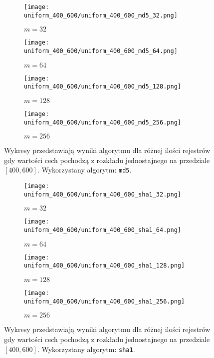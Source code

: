 \begin{figure}[H]
    \begin{subfigure}{0.5\textwidth}
        \texttt{[image: uniform\_400\_600/uniform\_400\_600\_md5\_32.png]}
        \caption{$m = 32$}
        \label{fig:subim1}
    \end{subfigure}
    \begin{subfigure}{0.5\textwidth}
        \texttt{[image: uniform\_400\_600/uniform\_400\_600\_md5\_64.png]}
        \caption{$m = 64$}
        \label{fig:subim1}
    \end{subfigure}
    \begin{subfigure}{0.5\textwidth}
        \texttt{[image: uniform\_400\_600/uniform\_400\_600\_md5\_128.png]}
        \caption{$m = 128$}
        \label{fig:subim2}
    \end{subfigure}
    \begin{subfigure}{0.5\textwidth}
        \texttt{[image: uniform\_400\_600/uniform\_400\_600\_md5\_256.png]}
        \caption{$m = 256$}
        \label{fig:subim2}
    \end{subfigure}

    \caption{Wykresy przedstawiają wyniki algorytmu dla różnej ilości rejestrów gdy wartości cech pochodzą z rozkładu jednostajnego na przedziale $[400, 600]$. Wykorzystany algorytm: \texttt{md5}.}
    \label{fig:uniform_md5}
\end{figure}

\begin{figure}[H]
    \begin{subfigure}{0.5\textwidth}
        \texttt{[image: uniform\_400\_600/uniform\_400\_600\_sha1\_32.png]}
        \caption{$m = 32$}
        \label{fig:subim1}
    \end{subfigure}
    \begin{subfigure}{0.5\textwidth}
        \texttt{[image: uniform\_400\_600/uniform\_400\_600\_sha1\_64.png]}
        \caption{$m = 64$}
        \label{fig:subim1}
    \end{subfigure}
    \begin{subfigure}{0.5\textwidth}
        \texttt{[image: uniform\_400\_600/uniform\_400\_600\_sha1\_128.png]}
        \caption{$m = 128$}
        \label{fig:subim2}
    \end{subfigure}
    \begin{subfigure}{0.5\textwidth}
        \texttt{[image: uniform\_400\_600/uniform\_400\_600\_sha1\_256.png]}
        \caption{$m = 256$}
        \label{fig:subim2}
    \end{subfigure}

    \caption{Wykresy przedstawiają wyniki algorytmu dla różnej ilości rejestrów gdy wartości cech pochodzą z rozkładu jednostajnego na przedziale $[400, 600]$. Wykorzystany algorytm: \texttt{sha1}.}
    \label{fig:uniform_sha1}
\end{figure}

